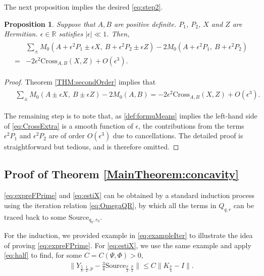 \documentclass{article}
\numberwithin{equation}{section}
\newtheorem{proposition}[theorem]{Proposition}
\begin{document}
The next proposition implies the desired \eqref{eq:step2}.
\begin{proposition}\label{prop:p1p2}
Suppose that $A, B$ are positive definite. $P_1$, $P_2$, $X$ and $Z$ are Hermitian. $\epsilon \in \mathbb{R}$ satisfies $|\epsilon| \ll 1$.
Then,
\begin{align}\label{eq:CrossExtra}
\begin{split}
    &\sum_{\pm}M_0(A + \epsilon^2 P_1  \pm \epsilon X, \ B + \epsilon^2 P_2 \pm \epsilon Z)  
    - 2 M_0(A + \epsilon^2 P_1, \ B + \epsilon^2 P_2) \\
    =& -2 \epsilon^2 \text{Cross}_{A,B}(X,Z) + O(\epsilon^3).
\end{split}
\end{align}
\end{proposition}

\begin{proof}
Theorem \ref{THM:secondOrder} implies that
\begin{align}
\begin{split}
&\sum_{\pm}M_0(A \pm \epsilon X, \ B \pm \epsilon Z)  - 2 M_0(A, B)
= -2 \epsilon^2 \text{Cross}_{A,B}(X,Z) + O(\epsilon^3).
\end{split}
\end{align}


The remaining step is to note that, as \eqref{def:formuMeans} implies the left-hand side of \eqref{eq:CrossExtra} is a smooth function of $\epsilon$, the contributions from the terms $\epsilon^2 P_1$ and $\epsilon^2 P_2$ are of order $O(\epsilon^3)$ due to cancellations. The detailed proof is straightforward but tedious, and is therefore omitted.


\end{proof}



\subsection{Proof of Theorem \ref{MainTheorem:concavity}}\label{sub:concavity}
\eqref{eq:expreFPrime} and \eqref{eq:estiX} can be obtained by a standard induction process using the iteration relation \eqref{eq:OmegaQR}, by which all the terms in $Q_{q,r}$ can be traced back to some $\text{Source}_{q_0,r_0}$.

For the induction, we provided example in \eqref{eq:exampleIter} to illustrate the idea of proving \eqref{eq:expreFPrime}. For \eqref{eq:estiX}, we use the same example and apply \eqref{eq:half} to find, for some $C=C(\Psi,\Phi)>0$,
\begin{align}
\|Y_{\frac{5}{8},\frac{1}{2},p}-\frac{3}{4}\text{Source}_{\frac{p}{2},\frac{p}{2}}\|\leq C \|K_{\frac{p}{4}}-I\|.
\end{align}
\end{document}
